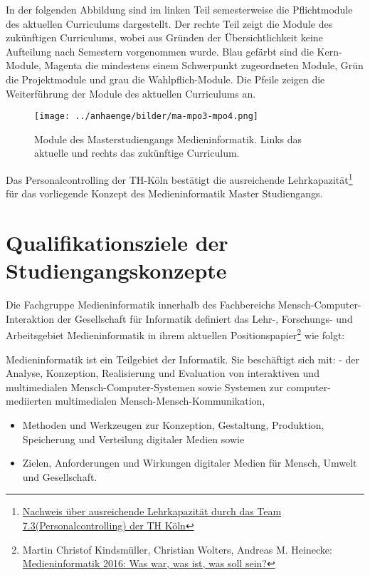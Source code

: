 In der folgenden Abbildung sind im linken Teil semesterweise die
Pflichtmodule des aktuellen Curriculums dargestellt. Der rechte Teil
zeigt die Module des zukünftigen Curriculums, wobei aus Gründen der
Übersichtlichkeit keine Aufteilung nach Semestern vorgenommen wurde.
Blau gefärbt sind die Kern-Module, Magenta die mindestens einem
Schwerpunkt zugeordneten Module, Grün die Projektmodule und grau die
Wahlpflich-Module. Die Pfeile zeigen die Weiterführung der Module des
aktuellen Curriculums an.

\begin{figure}[htbp]
\centering
\texttt{[image: ../anhaenge/bilder/ma-mpo3-mpo4.png]}
\caption{Module des Masterstudiengangs Medieninformatik. Links das
aktuelle und rechts das zukünftige Curriculum.}
\end{figure}

Das Personalcontrolling der TH-Köln bestätigt die ausreichende
Lehrkapazität\footnote{\href{https://th-koeln.github.io/mi-2017/anhaenge/th-verwaltung-kapa-nachweis.pdf}{Nachweis
  über ausreichende Lehrkapazität durch das Team
  7.3(Personalcontrolling) der TH Köln}} für das vorliegende Konzept des
Medieninformatik Master Studiengangs.

\chapter{Qualifikationsziele der
Studiengangskonzepte\label{/mi-2017/selbstbericht/0200-qualifikationsziele/0000-qualifikationsziele}}\label{qualifikationsziele-der-studiengangskonzeptepathlabelmi-2017selbstbericht0200-qualifikationsziele0000-qualifikationsziele}

Die Fachgruppe Medieninformatik innerhalb des Fachbereichs
Mensch-Computer-Interaktion der Gesellschaft für Informatik definiert
das Lehr-, Forschungs- und Arbeitsgebiet Medieninformatik in ihrem
aktuellen Positionspapier\footnote{Martin Christof Kindsmüller,
  Christian Wolters, Andreas M. Heinecke:
  \href{http://dl.mensch-und-computer.de/bitstream/handle/123456789/5131/Kindsm\%C3\%BCller_Wolters_Heinecke_2016.pdf}{Medieninformatik
  2016: Was war, was ist, was soll sein?}} wie folgt:

\begin{siderules}
Medieninformatik ist ein Teilgebiet der Informatik. Sie beschäftigt sich
mit: - der Analyse, Konzeption, Realisierung und Evaluation von
interaktiven und multimedialen Mensch-Computer-Systemen sowie Systemen
zur computer-mediierten multimedialen Mensch-Mensch-Kommunikation,

\begin{itemize}
\tightlist
\item
  Methoden und Werkzeugen zur Konzeption, Gestaltung, Produktion,
  Speicherung und Verteilung digitaler Medien sowie
\item
  Zielen, Anforderungen und Wirkungen digitaler Medien für Mensch,
  Umwelt und Gesellschaft.
\end{itemize}
\end{siderules}

